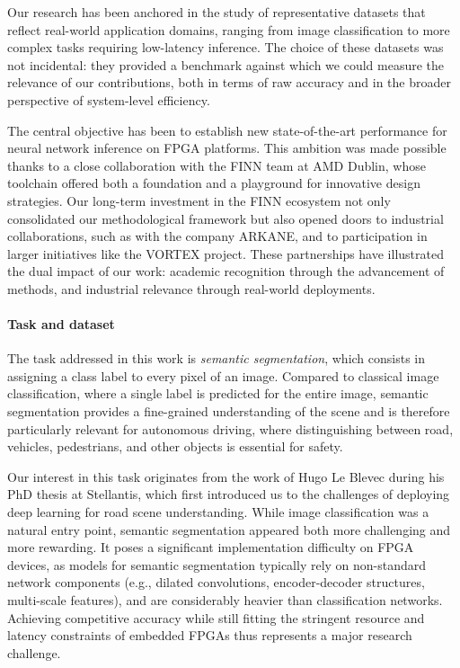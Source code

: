 \documentclass[11pt]{report}
\begin{document}
Our research has been anchored in the study of representative datasets that reflect real-world application domains, ranging from image classification to more complex tasks requiring low-latency inference. The choice of these datasets was not incidental: they provided a benchmark against which we could measure the relevance of our contributions, both in terms of raw accuracy and in the broader perspective of system-level efficiency.

The central objective has been to establish new state-of-the-art performance for neural network inference on FPGA platforms. This ambition was made possible thanks to a close collaboration with the FINN team at AMD Dublin, whose toolchain offered both a foundation and a playground for innovative design strategies. Our long-term investment in the FINN ecosystem not only consolidated our methodological framework but also opened doors to industrial collaborations, such as with the company ARKANE, and to participation in larger initiatives like the VORTEX project. These partnerships have illustrated the dual impact of our work: academic recognition through the advancement of methods, and industrial relevance through real-world deployments.

\paragraph{Task and dataset}


The task addressed in this work is \textit{semantic segmentation}, which consists in assigning a class label to every pixel of an image. Compared to classical image classification, where a single label is predicted for the entire image, semantic segmentation provides a fine-grained understanding of the scene and is therefore particularly relevant for autonomous driving, where distinguishing between road, vehicles, pedestrians, and other objects is essential for safety.

Our interest in this task originates from the work of Hugo Le Blevec during his PhD thesis at Stellantis, which first introduced us to the challenges of deploying deep learning for road scene understanding. While image classification was a natural entry point, semantic segmentation appeared both more challenging and more rewarding. It poses a significant implementation difficulty on FPGA devices, as models for semantic segmentation typically rely on non-standard network components (e.g., dilated convolutions, encoder-decoder structures, multi-scale features), and are considerably heavier than classification networks. Achieving competitive accuracy while still fitting the stringent resource and latency constraints of embedded FPGAs thus represents a major research challenge.
\end{document}
